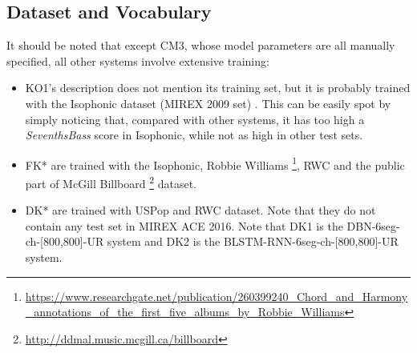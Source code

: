 \subsection{Dataset and Vocabulary}
It should be noted that except CM3, whose model parameters are all manually specified, all other systems involve extensive training:
\begin{itemize}
\item KO1's description does not mention its training set, but it is probably trained with the Isophonic dataset (MIREX 2009 set) \cite{burgoyne2014comparative}. This can be easily spot by simply noticing that, compared with other systems, it has too high a \textit{SeventhsBass} score in Isophonic, while not as high in other test sets.

\item FK* are trained with the Isophonic, Robbie Williams \footnote{\url{https://www.researchgate.net/publication/260399240\_Chord\_and\_Harmony\_annotations\_of\_the\_first\_five\_albums\_by\_Robbie\_Williams}}, RWC and the public part of McGill Billboard \footnote{\url{http://ddmal.music.mcgill.ca/billboard}} dataset.

\item DK* are trained with USPop and RWC dataset. Note that they do not contain any test set in MIREX ACE 2016. Note that DK1 is the DBN-6seg-ch-[800,800]-UR system and DK2 is the BLSTM-RNN-6seg-ch-[800,800]-UR system.
\end{itemize}

